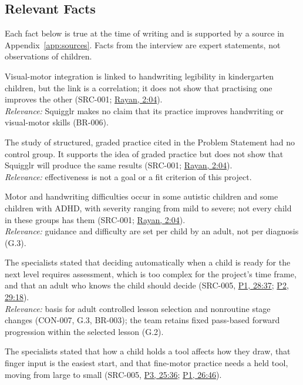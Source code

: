 \documentclass[12pt]{article}
\renewcommand{\_}{\textunderscore\allowbreak}%
\newcommand{\intlink}[3]{\hyperref[int:#1-#2]{#3}}
\newcommand{\intref}[2]{\intlink{#1}{#2}{#1, #2}}
\begin{document}
\subsection{Relevant Facts}
\label{sec:facts}
Each fact below is true at the time of writing and is supported by a source in
Appendix~\ref{app:sources}. Facts from the interview are expert statements, not
observations of children.

\begin{description}[style=nextline]
\item[FACT-001] Visual-motor integration is linked to handwriting legibility in
kindergarten children, but the link is a correlation; it does not show that
practising one improves the other (SRC-001; \intref{Rayan}{2:04}).\\
\emph{Relevance:} Squigglr makes no claim that its practice improves handwriting
or visual-motor skills (BR-006).
\item[FACT-002] The study of structured, graded practice cited in the Problem
Statement had no control group. It supports the idea of graded practice but does
not show that Squigglr will produce the same results (SRC-001;
\intref{Rayan}{2:04}).\\
\emph{Relevance:} effectiveness is not a goal or a fit criterion of this
project.
\item[FACT-003] Motor and handwriting difficulties occur in some autistic
children and some children with ADHD, with severity ranging from mild to severe;
not every child in these groups has them (SRC-001; \intref{Rayan}{2:04}).\\
\emph{Relevance:} guidance and difficulty are set per child by an adult, not per
diagnosis (G.3).
\item[FACT-004] The specialists stated that deciding automatically when a child
is ready for the next level requires assessment, which is too complex for the
project's time frame, and that an adult who knows the child should decide
(SRC-005, \intref{P1}{28:37}; \intref{P2}{29:18}).\\
\emph{Relevance:} basis for adult controlled lesson selection and nonroutine
stage changes (CON-007, G.3, BR-003); the team retains fixed pass-based forward
progression within the selected lesson (G.2).
\item[FACT-005] The specialists stated that how a child holds a tool affects how
they draw, that finger input is the easiest start, and that fine-motor practice
needs a held tool, moving from large to small (SRC-005, \intref{P3}{25:36};
\intref{P1}{26:46}).\\

\end{description}
\end{document}
